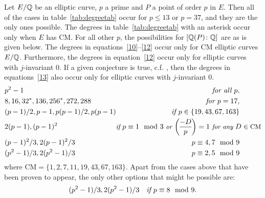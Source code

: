 \begin{thm} \label{thm:definitionfield}
Let $E/\mathbb{Q}$ be an elliptic curve, $p$ a prime and $P$ a point of order $p$ in $E$. Then all of the cases in table~\ref{tab:degreetab} occur for $p \leq 13$ or $p= 37$, and they are the only ones possible. The degrees in table~\ref{tab:degreetab} with an asterisk occur only when $E$ has CM. For all other $p$, the possibilities for $[\mathbb{Q}(P) \colon \mathbb{Q}]$ are as is given below. The degrees in equations~\ref{10}--\ref{12} occur only for CM elliptic curves $E/\mathbb{Q}$. Furthermore, the degrees in equation~\ref{12} occur only for elliptic curves with $j$-invariant 0. If a given conjecture is true, c.f. \cite[Conj.~3.5]{gonzalezjimeneznajman20base}, then the degrees in equations~\ref{13} also occur only for elliptic curves with $j$-invariant 0.
	\begin{align}
	\pushleft{p^2 - 1} & \pushright{\text{\itshape for all } p,\quad\quad\quad}  \label{8} \\
	\pushleft{8, 16, 32^*, 136, 256^*, 272, 288} & \pushright{\text{\itshape for } p= 17,\quad\quad\quad} \label{9} \\
	\pushleft{(p - 1)/2, p - 1, p(p - 1)/2, p(p - 1)} & \pushright{\text{\itshape if } p \in \{ 19, 43, 67, 163 \}\quad\quad\quad} \label{10} \\
	\pushleft{2(p - 1), (p - 1)^2} & {\small \text{\itshape if } p \equiv 1 \mod 3 \text{\itshape\ or } \genfrac(){}{0}{-D}{p}= 1 \text{\itshape\ for any } D \in \text{CM} }\label{11} \\
	\pushleft{(p - 1)^2/3, 2(p - 1)^2/3} &  \pushright{p \equiv 4, 7 \mod 9 \quad\quad\quad} \label{12} \\
	\pushleft{(p^2 - 1)/3, 2(p^2 - 1)/3} &  \pushright{p \equiv 2, 5 \mod 9 \quad\quad\quad} \label{13}
	\end{align}
where $\text{CM}= \{ 1, 2, 7, 11, 19, 43, 67, 163 \}$. Apart from the cases above that have been proven to appear, the only other options that might be possible are:
	\begin{equation} \label{14}
	(p^2 - 1)/3, 2(p^2 - 1)/3 \quad \text{\itshape if } p \equiv 8 \mod 9.
	\end{equation}
\end{thm}

